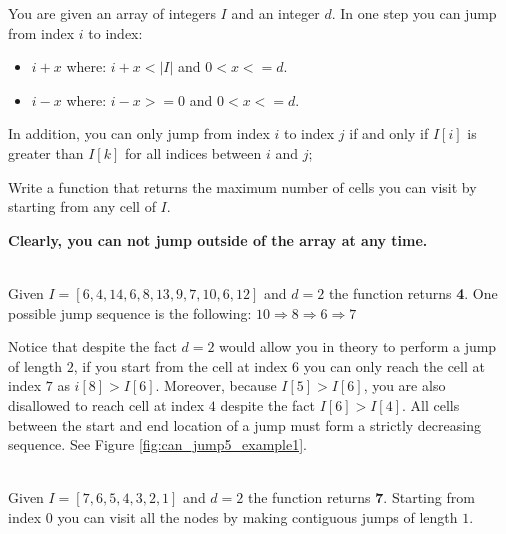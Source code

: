 \begin{exercise}
    You are given an array of integers $I$  and an integer $d$.
    In one step you can jump from index $i$ to index:
    \begin{itemize}
        \item $i + x$ where: $i + x < |I|$ and $0 < x <= d$.
        \item $i - x$ where: $i - x >= 0$ and $0 < x <= d$. 
    \end{itemize}
    In addition, you can only jump from index $i$ to index $j$ if and only if $I[i]$ is greater than $I[k]$ for all indices between $i$ and $j$;
        
    Write a function that returns the maximum number of cells you can visit by starting from any cell of $I$.
              
    \textbf{Clearly, you can not jump outside of the array at any time.}
    
    \begin{example}
        \hfill \\
        Given  $I=[6,4,14,6,8,13,9,7,10,6,12]$ and $d=2$ the function returns \textbf{4}.
        One possible jump sequence is the following:
        $10 \Rightarrow 8 \Rightarrow 6 \Rightarrow 7 $
        
        Notice that despite the fact $d=2$ would allow you in theory to perform a jump of length $2$, if you start from the cell at index $6$ you can only reach the cell at index $7$ as $i[8]>I[6]$. Moreover, because $I[5] > I[6]$, you are also disallowed to reach cell at index $4$ despite the fact $I[6] > I[4]$. All cells between the start and end location of a jump must form a strictly decreasing sequence. See Figure \ref{fig:can_jump5_example1}.
        \label{ex:can_jump5_example1}
    \end{example}


    \begin{example}
        \hfill \\
        Given  $I=[7,6,5,4,3,2,1]$ and $d=2$ the function returns \textbf{7}.
        Starting from index $0$ you can visit all the nodes by making contiguous jumps of length $1$.
        \label{ex:can_jump5_example2}
    \end{example}
\end{exercise}




